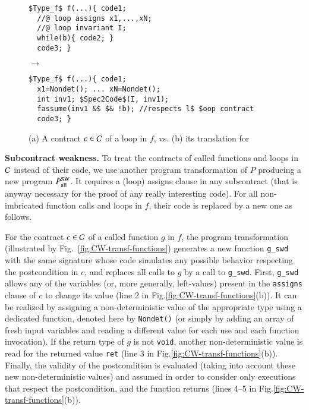 \begin{figure}[tb]
\begin{minipage}{0.4\columnwidth}
\begin{lstlisting}[mathescape]
$Type_f$ f(...){ code1;
  //@ loop assigns x1,...,xN;
  //@ loop invariant I; 
  while(b){ code2; }
  code3; }
\end{lstlisting}
\end{minipage}
\hspace{-6mm}
\begin{minipage}{0.07\columnwidth}$\to$\end{minipage}
\begin{minipage}{0.6\columnwidth}
\begin{lstlisting}[mathescape]
$Type_f$ f(...){ code1;
  x1=Nondet(); ... xN=Nondet();
  int inv1; $Spec2Code$(I, inv1);
  fassume(inv1 &$ $& !b); //respects l$ $oop contract
  code3; }
\end{lstlisting}
\end{minipage}
\caption{(a) A contract $c\in{\ensuremath\mathcal{C}}$ of a loop in $f$, vs. 
(b) its translation
for \CWD}
\label{fig:CW-transf-loops}
\end{figure}

\textbf{Subcontract weakness.}
To treat the contracts of called functions and loops in ${\mathcal{C}}$
instead of their code,
we use another program transformation of $P$ producing a new program $P_\mathrm{all}^{\mathrm{SW}}$.
It requires a (loop) assigns clause in any subcontract
(that is anyway necessary for the proof of any really interesting code).
For all non-imbricated function calls and loops in $f$,
their code is replaced by a new one as follows.

For the contract $c\in{\ensuremath\mathcal{C}}$ of a called function $g$ in $f$, 
the program transformation  (illustrated by Fig.~\ref{fig:CW-transf-functions})
generates a new function \lstinline{g_swd} with the same signature 
whose code simulates any possible behavior respecting the postcondition in $c$, 
and replaces all calls to $g$ by  a call to \lstinline{g_swd}.
First, \lstinline{g_swd} allows any of the variables 
(or, more generally, left-values) present in
the \lstinline{assigns} clause of $c$ to change its value 
(line 2 in Fig.\ref{fig:CW-transf-functions}(b)).
It can be realized by assigning a non-deterministic 
value of the appropriate type
using a dedicated function, denoted here by \lstinline{Nondet()}
(or simply by adding an array of fresh input variables and reading
a different value for each use and each function invocation).
If the return type of $g$ is not \lstinline{void},
another non-deterministic value is read for the returned value
\lstinline{ret} (line 3 in Fig.\ref{fig:CW-transf-functions}(b)).
Finally, the validity of the postcondition is evaluated (taking into
account these new non-deterministic values) 
and assumed
in order to consider only executions that respect 
the postcondition, and
the function returns (lines 4--5 in Fig.\ref{fig:CW-transf-functions}(b)).

